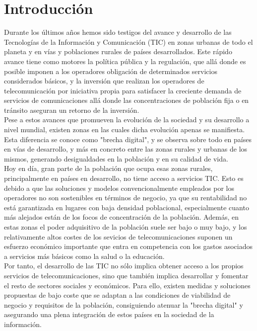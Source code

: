 \chapter{Introducción}
\label{cap:introduccion}
	Durante los últimos años hemos sido testigos del avance y desarrollo de las Tecnologías de la Información y Comunicación (TIC) en zonas urbanas de todo el planeta y en vías y poblaciones rurales  de países desarrollados. Este rápido avance tiene como motores la política pública y la regulación, que allá donde es posible imponen a los operadores obligación de determinados servicios considerados básicos, y la inversión que realizan los operadores de telecomunicación por iniciativa propia para satisfacer la creciente demanda de servicios de comunicaciones allá donde las concentraciones de población fija o en tránsito aseguran un retorno de la inversión.\\
	
	Pese a estos avances que promueven la evolución de la sociedad y su desarrollo a nivel mundial, existen zonas en las cuales dicha evolución apenas se manifiesta. Esta diferencia se conoce como "brecha digital", y se observa sobre todo en países en vías de desarrollo, y más en concreto entre las zonas rurales y urbanas de los mismos, generando desigualdades en la población y en su calidad de vida.\\
	
	Hoy en día, gran parte de la población que ocupa esas zonas rurales, principalmente en países en desarrollo, no tiene acceso a servicios TIC. Esto es debido a que las soluciones y modelos convencionalmente empleados por los operadores no son sostenibles en términos de negocio, ya que su rentabilidad no está garantizada en lugares con baja densidad poblacional, especialmente cuanto más alejados están de los focos de concentración de la población. Además, en estas zonas el poder adquisitivo de la población suele ser bajo o muy bajo, y los relativamente altos costes de los sevicios de telecomunicaciones suponen un esfuerzo económico importante que entra en competencia con los gastos asociados a servicios más básicos como la salud o la educación.\\
	
	Por tanto, el desarrollo de las TIC no sólo implica obtener acceso a los propios servicios de telecomunicaciones, sino que también implica desarrollar y fomentar el resto de sectores sociales y económicos. Para ello, existen medidas y soluciones propuestas de bajo coste que se adaptan a las condiciones de viabilidad de negocio y requisitos de la población, consiguiendo atenuar la "brecha digital" y asegurando una plena integración de estos países en la sociedad de la información.
	

